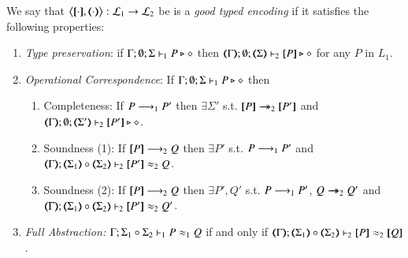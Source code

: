 \begin{definition}
	\label{def:ep}
	We say that $\enc{\cdot}{\cdot} : \tyl{L}_1 \to \tyl{L}_2$ be is a \emph{good  typed encoding} if it satisfies the following properties:
	
	\begin{enumerate}[1.]
		\item \emph{Type preservation}:	%
		if
			$\Gamma; \emptyset; \Sigma \vdash_1 P \triangleright \diamond$ then $\mapt{\Gamma}; \emptyset; \mapt{\Sigma} \proves_2 \map{P} \hastype \Proc$ for any   $P$ in $L_1$.

		\item \emph{Operational Correspondence}: If $\Gamma; \emptyset; \Sigma \vdash_1 P \triangleright \diamond$ then
		\begin{enumerate}[-]
			\item	Completeness: If $P \longrightarrow_1 P'$ then $\exists \Sigma'$ s.t.
				$\map{P} \Red_2 \map{P'}$ and
				$\mapt{\Gamma}; \emptyset; \mapt{\Sigma'} \proves_2 \map{P'} \hastype \Proc$.
			\item Soundness (1): If $[\!\![P]\!\!] \longrightarrow_2 Q$ then
				$\exists P'$ s.t. $P \longrightarrow_1 P'$ and \\
				$\mapt{\Gamma}; \mapt{\Sigma_1} \circ \mapt{\Sigma_2} \proves_2 \map{P'} \wb_2 Q$.
			\item Soundness (2): If $[\!\![P]\!\!] \longrightarrow_2 Q$ then
				$\exists P', Q'$ s.t. $P \longrightarrow_1 P'$, $Q \rightarrow\!\!\!\!\!\rightarrow_2 Q'$ and \\
				$\mapt{\Gamma}; \mapt{\Sigma_1} \circ \mapt{\Sigma_2} \proves_2 \map{P'} \wb_2 Q'$.
		\end{enumerate}
		
		\item \emph{Full Abstraction:} %
		$\Gamma; \Sigma_1 \circ \Sigma_2 \vdash_1 P \approx_1 Q $ if and only if $\mapt{\Gamma}; \mapt{\Sigma_1} \circ \mapt{\Sigma_2} \proves_2 \map{P} \wb_2 \map{Q} $.
	\end{enumerate}
\end{definition}

